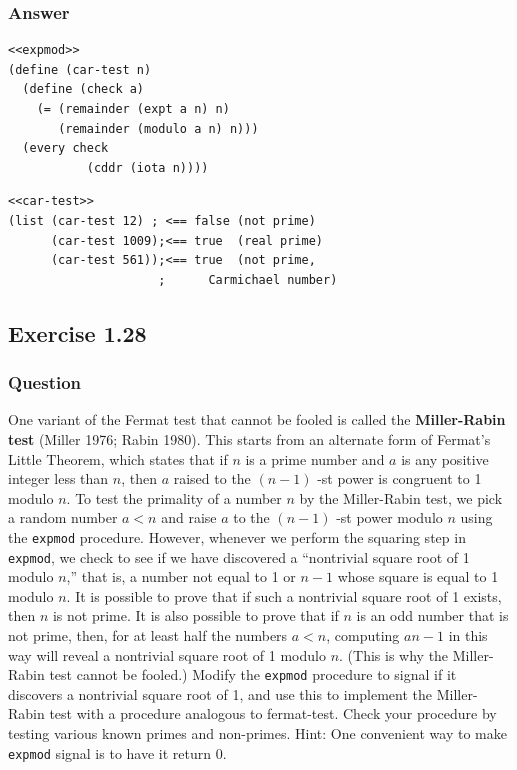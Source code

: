 \documentclass[final,fleqn,titlepage,twoside]{article}
\begin{document}
\subsubsection{Answer}
\label{sec:orgcf8cfe3}
\begin{verbatim}
<<expmod>>
(define (car-test n)
  (define (check a)
    (= (remainder (expt a n) n)
       (remainder (modulo a n) n)))
  (every check
           (cddr (iota n))))
\end{verbatim}

\begin{verbatim}
<<car-test>>
(list (car-test 12) ; <== false (not prime)
      (car-test 1009);<== true  (real prime)
      (car-test 561));<== true  (not prime,
                     ;      Carmichael number)
\end{verbatim}

\subsection{Exercise 1.28}
\label{sec:orgf0a50bc}
\subsubsection{Question}
\label{sec:org59bc849}
One variant of the Fermat test that cannot be fooled is called the
\textbf{\textbf{Miller-Rabin test}} (Miller 1976; Rabin 1980). This starts from an alternate
form of Fermat's Little Theorem, which states that if \(n\) is a prime number
and \(a\) is any positive integer less than \(n\), then \(a\) raised to
the \((n-1)\) -st power is congruent to 1 modulo \(n\). To test the
primality of a number \(n\) by the Miller-Rabin test, we pick a random number
\(a<n\) and raise \(a\) to the \((n-1)\) -st power modulo \(n\) using
the \texttt{expmod} procedure. However, whenever we perform the squaring step
in \texttt{expmod}, we check to see if we have discovered a ``nontrivial
square root of 1 modulo \(n\),'' that is, a number not equal to 1 or \(n-1\)
whose square is equal to 1 modulo \(n\). It is possible to prove that if such
a nontrivial square root of 1 exists, then \(n\) is not prime. It is also
possible to prove that if \(n\) is an odd number that is not prime, then, for
at least half the numbers \(a<n\), computing \(an-1\) in this way will
reveal a nontrivial square root of 1 modulo \(n\). (This is why the
Miller-Rabin test cannot be fooled.) Modify the \texttt{expmod} procedure to
signal if it discovers a nontrivial square root of 1, and use this to implement
the Miller-Rabin test with a procedure analogous to fermat-test. Check your
procedure by testing various known primes and non-primes. Hint: One convenient
way to make \texttt{expmod} signal is to have it return 0.
\end{document}
